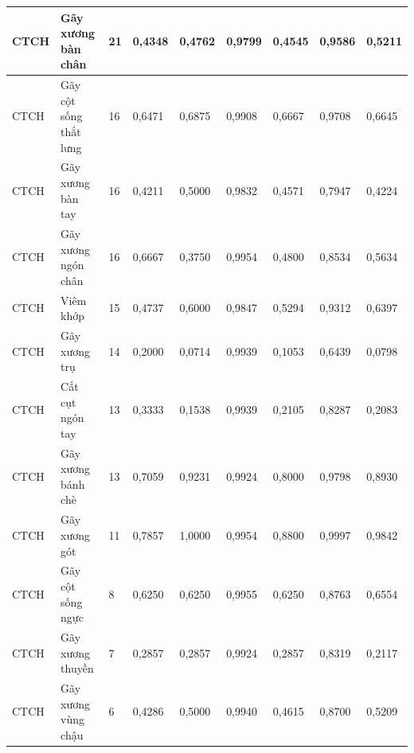 \begin{landscape}
\begin{longtable}{|C{1.35cm}|L{4.25cm}|C{0.75cm}|C{1.35cm}|C{1.35cm}|C{1.45cm}|C{1.25cm}|C{1.25cm}|C{1.25cm}|}
\hline
CTCH & Gãy xương bàn chân & 21 & 0,4348 & 0,4762 & 0,9799 & 0,4545 & 0,9586 & 0,5211 \\
\hline
CTCH & Gãy cột sống thắt lưng & 16 & 0,6471 & 0,6875 & 0,9908 & 0,6667 & 0,9708 & 0,6645 \\
\hline
CTCH & Gãy xương bàn tay & 16 & 0,4211 & 0,5000 & 0,9832 & 0,4571 & 0,7947 & 0,4224 \\
\hline
CTCH & Gãy xương ngón chân & 16 & 0,6667 & 0,3750 & 0,9954 & 0,4800 & 0,8534 & 0,5634 \\
\hline
CTCH & Viêm khớp & 15 & 0,4737 & 0,6000 & 0,9847 & 0,5294 & 0,9312 & 0,6397 \\
\hline
CTCH & Gãy xương trụ & 14 & 0,2000 & 0,0714 & 0,9939 & 0,1053 & 0,6439 & 0,0798 \\
\hline
CTCH & Cắt cụt ngón tay & 13 & 0,3333 & 0,1538 & 0,9939 & 0,2105 & 0,8287 & 0,2083 \\
\hline
CTCH & Gãy xương bánh chè & 13 & 0,7059 & 0,9231 & 0,9924 & 0,8000 & 0,9798 & 0,8930 \\
\hline
CTCH & Gãy xương gót & 11 & 0,7857 & 1,0000 & 0,9954 & 0,8800 & 0,9997 & 0,9842 \\
\hline
CTCH & Gãy cột sống ngực & 8 & 0,6250 & 0,6250 & 0,9955 & 0,6250 & 0,8763 & 0,6554 \\
\hline
CTCH & Gãy xương thuyền & 7 & 0,2857 & 0,2857 & 0,9924 & 0,2857 & 0,8319 & 0,2117 \\
\hline
CTCH & Gãy xương vùng chậu & 6 & 0,4286 & 0,5000 & 0,9940 & 0,4615 & 0,8700 & 0,5209 \\

\end{longtable}
\endgroup
\end{landscape}
